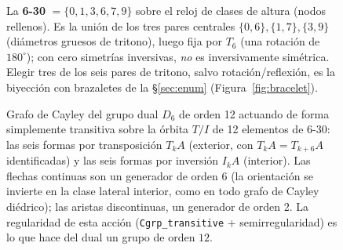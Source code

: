 \documentclass[11pt]{article}
\newcommand{\lean}[1]{\texttt{#1}}
\newcommand{\Dgrp}[1]{D_{#1}}
\begin{document}
\begin{figure}[h]
\centering
{}
\caption{La \textbf{6-30} $=\{0,1,3,6,7,9\}$ sobre el reloj de clases de altura (nodos rellenos). Es la
unión de los tres pares centrales $\{0,6\},\{1,7\},\{3,9\}$ (diámetros gruesos de tritono), luego fija
por $T_6$ (una rotación de $180^\circ$); con cero simetrías inversivas, \emph{no} es inversivamente
simétrica. Elegir tres de los seis pares de tritono, salvo rotación/reflexión, es la biyección con
brazaletes de la \S\ref{sec:enum} (Figura~\ref{fig:bracelet}).}
\label{fig:clock}
\end{figure}

\begin{figure}[h]
\centering
{}
\caption{Grafo de Cayley del grupo dual $\Dgrp{6}$ de orden 12 actuando de forma simplemente transitiva
sobre la órbita $T/I$ de 12 elementos de 6-30: las seis formas por transposición $T_kA$ (exterior, con
$T_kA=T_{k+6}A$ identificadas) y las seis formas por inversión $I_kA$ (interior). Las flechas continuas
son un generador de orden 6 (la orientación se invierte en la clase lateral interior, como en todo grafo
de Cayley diédrico); las aristas discontinuas, un generador de orden 2. La regularidad de esta acción
(\lean{Cgrp\_transitive} + semirregularidad) es lo que hace del dual un grupo de orden $12$.}
\label{fig:cayley}
\end{figure}
\end{document}
